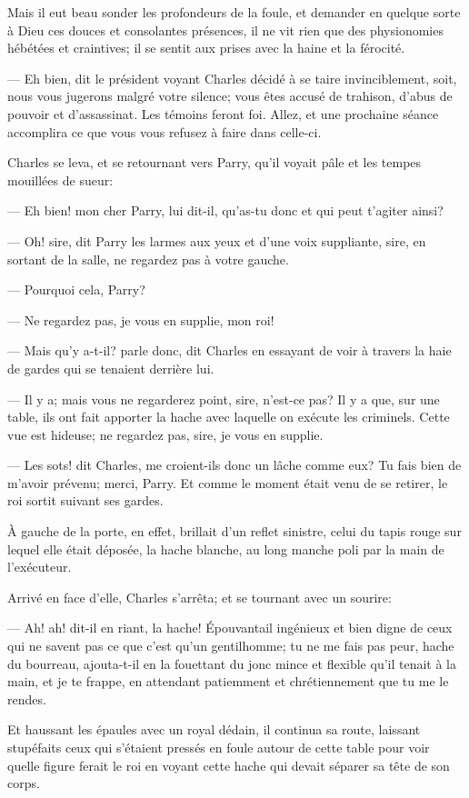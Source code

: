 Mais il eut beau sonder les profondeurs de la foule, et demander en quelque sorte à Dieu ces douces et consolantes présences, il ne vit rien que des physionomies hébétées et craintives; il se sentit aux prises avec la haine et la férocité.

— Eh bien, dit le président voyant Charles décidé à se taire invinciblement, soit, nous vous jugerons malgré votre silence; vous êtes accusé de trahison, d'abus de pouvoir et d'assassinat. Les témoins feront foi. Allez, et une prochaine séance accomplira ce que vous vous refusez à faire dans celle-ci.

Charles se leva, et se retournant vers Parry, qu'il voyait pâle et les tempes mouillées de sueur:

— Eh bien! mon cher Parry, lui dit-il, qu'as-tu donc et qui peut t'agiter ainsi?

— Oh! sire, dit Parry les larmes aux yeux et d'une voix suppliante, sire, en sortant de la salle, ne regardez pas à votre gauche.

— Pourquoi cela, Parry?

— Ne regardez pas, je vous en supplie, mon roi!

— Mais qu'y a-t-il? parle donc, dit Charles en essayant de voir à travers la haie de gardes qui se tenaient derrière lui.

— Il y a; mais vous ne regarderez point, sire, n'est-ce pas? Il y a que, sur une table, ils ont fait apporter la hache avec laquelle on exécute les criminels. Cette vue est hideuse; ne regardez pas, sire, je vous en supplie.

— Les sots! dit Charles, me croient-ils donc un lâche comme eux? Tu fais bien de m'avoir prévenu; merci, Parry.
Et comme le moment était venu de se retirer, le roi sortit suivant ses gardes.

À gauche de la porte, en effet, brillait d'un reflet sinistre, celui du tapis rouge sur lequel elle était déposée, la hache blanche, au long manche poli par la main de l'exécuteur.

Arrivé en face d'elle, Charles s'arrêta; et se tournant avec un sourire:

— Ah! ah! dit-il en riant, la hache! Épouvantail ingénieux et bien digne de ceux qui ne savent pas ce que c'est qu'un gentilhomme; tu ne me fais pas peur, hache du bourreau, ajouta-t-il en la fouettant du jonc mince et flexible qu'il tenait à la main, et je te frappe, en attendant patiemment et chrétiennement que tu me le rendes.

Et haussant les épaules avec un royal dédain, il continua sa route, laissant stupéfaits ceux qui s'étaient pressés en foule autour de cette table pour voir quelle figure ferait le roi en voyant cette hache qui devait séparer sa tête de son corps.

